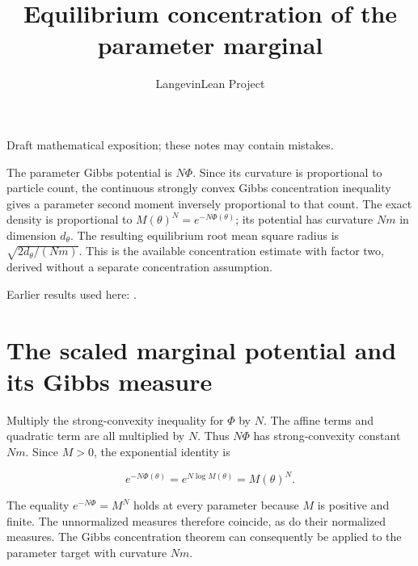 \documentclass[11pt,a4paper]{article}
\title{\texorpdfstring{Equilibrium concentration of the parameter marginal}{Equilibrium concentration of the parameter marginal}}
\author{LangevinLean Project}
\date{}
\begin{document}
\maketitle
Draft mathematical exposition; these notes may contain mistakes.


The parameter Gibbs potential is \(N\Phi\). Since its curvature is proportional to particle count, the continuous strongly convex Gibbs concentration inequality gives a parameter second moment inversely proportional to that count. The exact density is proportional to \(M(\theta)^N=e^{-N\Phi(\theta)}\); its potential has curvature \(Nm\) in dimension \(d_\theta\). The resulting equilibrium root mean square radius is \(\sqrt{2d_\theta/(Nm)}\). This is the available concentration estimate with factor two, derived without a separate concentration assumption.



Earlier results used here: \cite[Section~3.49]{LangevinLean2026ULASC}.

\section{\texorpdfstring{The scaled marginal potential and its Gibbs measure}{The scaled marginal potential and its Gibbs measure}}


Multiply the strong-convexity inequality for \(\Phi\) by \(N\). The affine terms and quadratic term are all multiplied by \(N\). Thus \(N\Phi\) has strong-convexity constant \(Nm\). Since \(M>0\), the exponential identity is

\[e^{-N\Phi(\theta)}=e^{N\log M(\theta)}=M(\theta)^N.\]

The equality \(e^{-N\Phi}=M^N\) holds at every parameter because \(M\) is positive and finite. The unnormalized measures therefore coincide, as do their normalized measures. The Gibbs concentration theorem can consequently be applied to the parameter target with curvature \(Nm\).
\end{document}
